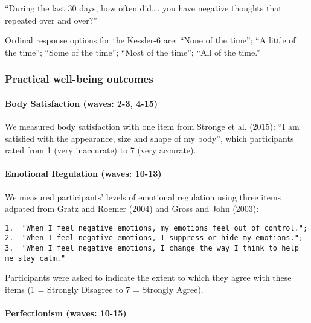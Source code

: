 \documentclass[
  letterpaper,
  DIV=11,
  numbers=noendperiod]{scrartcl}
\let\oldparagraph\paragraph
\renewcommand{\paragraph}[1]{\oldparagraph{#1}\mbox{}}
\begin{document}
``During the last 30 days, how often did\ldots. you have negative
thoughts that repeated over and over?''

Ordinal response options for the Kessler-6 are: ``None of the time'';
``A little of the time''; ``Some of the time''; ``Most of the time'';
``All of the time.''

\hypertarget{practical-well-being-outcomes}{%
\subsubsection{Practical well-being
outcomes}\label{practical-well-being-outcomes}}

\hypertarget{body-satisfaction-waves-2-3-4-15}{%
\paragraph{Body Satisfaction (waves: 2-3,
4-15)}\label{body-satisfaction-waves-2-3-4-15}}

We measured body satisfaction with one item from Stronge et al. (2015):
``I am satisfied with the appearance, size and shape of my body'', which
participants rated from 1 (very inaccurate) to 7 (very accurate).

\hypertarget{emotional-regulation-waves-10-13}{%
\paragraph{Emotional Regulation (waves:
10-13)}\label{emotional-regulation-waves-10-13}}

We measured participants' levels of emotional regulation using three
items adpated from Gratz and Roemer (2004) and Gross and John (2003):

\begin{verbatim}
1.  "When I feel negative emotions, my emotions feel out of control.";
2.  "When I feel negative emotions, I suppress or hide my emotions.";
3.  "When I feel negative emotions, I change the way I think to help me stay calm."
\end{verbatim}

Participants were asked to indicate the extent to which they agree with
these items (1 = Strongly Disagree to 7 = Strongly Agree).

\hypertarget{perfectionism-waves-10-15}{%
\paragraph{Perfectionism (waves:
10-15)}\label{perfectionism-waves-10-15}}
\end{document}
